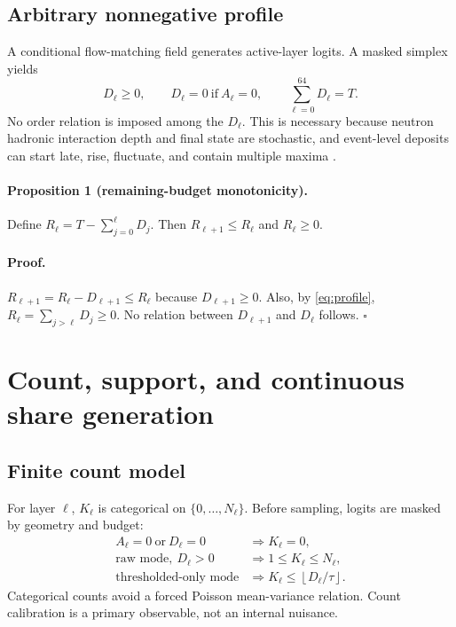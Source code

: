 \documentclass[10pt,a4paper]{article}
\begin{document}
\subsection{Arbitrary nonnegative profile}
A conditional flow-matching field generates active-layer logits. A masked simplex yields
\begin{equation}
 D_\ell\ge0,\qquad D_\ell=0\ \text{if}\ A_\ell=0,\qquad \sum_{\ell=0}^{64}D_\ell=T.
 \label{eq:profile}
\end{equation}
No order relation is imposed among the $D_\ell$. This is necessary because neutron hadronic interaction depth and final state are stochastic, and event-level deposits can start late, rise, fluctuate, and contain multiple maxima \cite{geant4_2003,geant4_2016,kulchitsky}.

\paragraph{Proposition 1 (remaining-budget monotonicity).}
Define $R_\ell=T-\sum_{j=0}^{\ell}D_j$. Then $R_{\ell+1}\le R_\ell$ and $R_\ell\ge0$.

\paragraph{Proof.}
$R_{\ell+1}=R_\ell-D_{\ell+1}\le R_\ell$ because $D_{\ell+1}\ge0$. Also, by \cref{eq:profile}, $R_\ell=\sum_{j>\ell}D_j\ge0$. No relation between $D_{\ell+1}$ and $D_\ell$ follows. \hfill$\square$

\section{Count, support, and continuous share generation}
\label{sec:count_support_share}

\subsection{Finite count model}
For layer $\ell$, $K_\ell$ is categorical on $\{0,\ldots,N_\ell\}$. Before sampling, logits are masked by geometry and budget:
\begin{align}
A_\ell=0\ \text{or}\ D_\ell=0 &\Rightarrow K_\ell=0,\\
\text{raw mode},\ D_\ell>0 &\Rightarrow 1\le K_\ell\le N_\ell,\\
\text{thresholded-only mode} &\Rightarrow K_\ell\le\left\lfloor D_\ell/\tau\right\rfloor.
\end{align}
Categorical counts avoid a forced Poisson mean-variance relation. Count calibration is a primary observable, not an internal nuisance.
\end{document}
